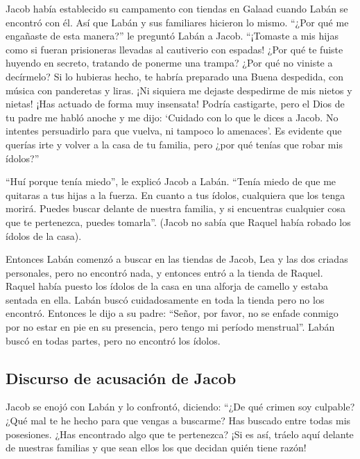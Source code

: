  Jacob había establecido su campamento con tiendas en
Galaad cuando Labán se encontró con él. Así que Labán y sus familiares
hicieron lo mismo.  ``¿Por qué me engañaste de esta
manera?'' le preguntó Labán a Jacob. ``¡Tomaste a mis hijas como si
fueran prisioneras llevadas al cautiverio con espadas! 
¿Por qué te fuiste huyendo en secreto, tratando de ponerme una trampa?
¿Por qué no viniste a decírmelo? Si lo hubieras hecho, te habría
preparado una Buena despedida, con música con panderetas y liras.
 ¡Ni siquiera me dejaste despedirme de mis nietos y
nietas! ¡Has actuado de forma muy insensata!  Podría
castigarte, pero el Dios de tu padre me habló anoche y me dijo: `Cuidado
con lo que le dices a Jacob. No intentes persuadirlo para que vuelva, ni
tampoco lo amenaces'.  Es evidente que querías irte y
volver a la casa de tu familia, pero ¿por qué tenías que robar mis
ídolos?''

 ``Huí porque tenía miedo'', le explicó Jacob a Labán.
``Tenía miedo de que me quitaras a tus hijas a la fuerza.
 En cuanto a tus ídolos, cualquiera que los tenga morirá.
Puedes buscar delante de nuestra familia, y si encuentras cualquier cosa
que te pertenezca, puedes tomarla''. (Jacob no sabía que Raquel había
robado los ídolos de la casa).

 Entonces Labán comenzó a buscar en las tiendas de Jacob,
Lea y las dos criadas personales, pero no encontró nada, y entonces
entró a la tienda de Raquel.  Raquel había puesto los
ídolos de la casa en una alforja de camello y estaba sentada en ella.
Labán buscó cuidadosamente en toda la tienda pero no los encontró.
 Entonces le dijo a su padre: ``Señor, por favor, no se
enfade conmigo por no estar en pie en su presencia, pero tengo mi
período menstrual''. Labán buscó en todas partes, pero no encontró los
ídolos.

\hypertarget{discurso-de-acusaciuxf3n-de-jacob}{%
\subsection{Discurso de acusación de
Jacob}\label{discurso-de-acusaciuxf3n-de-jacob}}

 Jacob se enojó con Labán y lo confrontó, diciendo: ``¿De
qué crimen soy culpable? ¿Qué mal te he hecho para que vengas a
buscarme?  Has buscado entre todas mis posesiones. ¿Has
encontrado algo que te pertenezca? ¡Si es así, tráelo aquí delante de
nuestras familias y que sean ellos los que decidan quién tiene razón!

